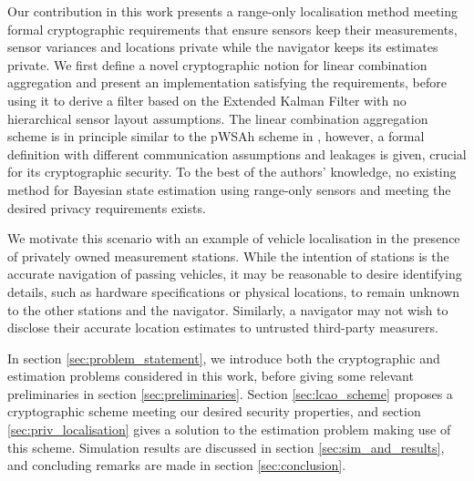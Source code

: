 \documentclass[10pt,letterpaper,oneside,twocolumn,journal]{IEEEtran}
\theoremstyle{definition}
\theoremstyle{definition}
\theoremstyle{remark}
\begin{document}
Our contribution in this work presents a range-only localisation method meeting formal cryptographic requirements that ensure sensors keep their measurements, sensor variances and locations private while the navigator keeps its estimates private. We first define a novel cryptographic notion for linear combination aggregation and present an implementation satisfying the requirements, before using it to derive a filter based on the Extended Kalman Filter with no hierarchical sensor layout assumptions. The linear combination aggregation scheme is in principle similar to the pWSAh scheme in \cite{alexandruPrivateWeightedSum2020}, however, a formal definition with different communication assumptions and leakages is given, crucial for its cryptographic security. To the best of the authors' knowledge, no existing method for Bayesian state estimation using range-only sensors and meeting the desired privacy requirements exists.

We motivate this scenario with an example of vehicle localisation in the presence of privately owned measurement stations. While the intention of stations is the accurate navigation of passing vehicles, it may be reasonable to desire identifying details, such as hardware specifications or physical locations, to remain unknown to the other stations and the navigator. Similarly, a navigator may not wish to disclose their accurate location estimates to untrusted third-party measurers.

In section \ref{sec:problem_statement}, we introduce both the cryptographic and estimation problems considered in this work, before giving some relevant preliminaries in section \ref{sec:preliminaries}. Section \ref{sec:lcao_scheme} proposes a cryptographic scheme meeting our desired security properties, and section \ref{sec:priv_localisation} gives a solution to the estimation problem making use of this scheme. Simulation results are discussed in section \ref{sec:sim_and_results}, and concluding remarks are made in section \ref{sec:conclusion}.

% 
% 
\end{document}
